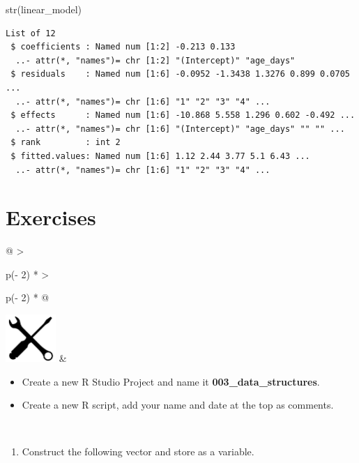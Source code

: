 \documentclass[
]{book}
\newenvironment{Shaded}{\begin{snugshade}}{\end{snugshade}}
\newcommand{\FunctionTok}[1]{\textcolor[rgb]{0.00,0.00,0.00}{#1}}
\newcommand{\NormalTok}[1]{#1}
\providecommand{\tightlist}{%
  \setlength{\itemsep}{0pt}\setlength{\parskip}{0pt}}
\begin{document}
\begin{Shaded}
\begin{Highlighting}[]
\FunctionTok{str}\NormalTok{(linear\_model)}
\end{Highlighting}
\end{Shaded}

\begin{verbatim}
List of 12
 $ coefficients : Named num [1:2] -0.213 0.133
  ..- attr(*, "names")= chr [1:2] "(Intercept)" "age_days"
 $ residuals    : Named num [1:6] -0.0952 -1.3438 1.3276 0.899 0.0705 ...
  ..- attr(*, "names")= chr [1:6] "1" "2" "3" "4" ...
 $ effects      : Named num [1:6] -10.868 5.558 1.296 0.602 -0.492 ...
  ..- attr(*, "names")= chr [1:6] "(Intercept)" "age_days" "" "" ...
 $ rank         : int 2
 $ fitted.values: Named num [1:6] 1.12 2.44 3.77 5.1 6.43 ...
  ..- attr(*, "names")= chr [1:6] "1" "2" "3" "4" ...
\end{verbatim}

\hypertarget{exercises-2}{%
\section*{Exercises}\label{exercises-2}}

\begin{longtable}[]{@{}
  >{\raggedright\arraybackslash}p{(\columnwidth - 2\tabcolsep) * }
  >{\raggedright\arraybackslash}p{(\columnwidth - 2\tabcolsep) * }@{}}
\toprule\noalign{}
\endhead
\bottomrule\noalign{}
\endlastfoot
\includegraphics[width=\textwidth,height=0.70833in]{images/07.png} & \begin{minipage}[t]{\linewidth}\raggedright
\begin{itemize}
\item
  Create a new R Studio Project and name it \textbf{003\_data\_structures}.
\item
  Create a new R script, add your name and date at the top as comments.
\end{itemize}
\end{minipage} \\
\end{longtable}

\begin{enumerate}
\def\labelenumi{\arabic{enumi}.}
\tightlist
\item
  Construct the following vector and store as a variable.
\end{enumerate}
\end{document}
